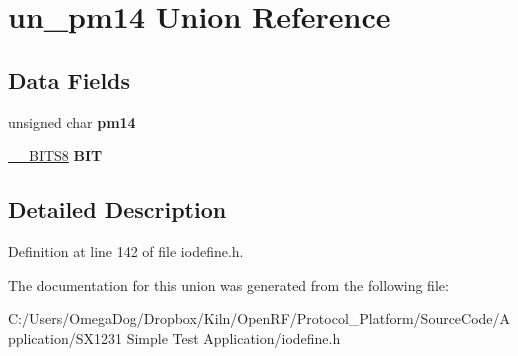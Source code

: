 \hypertarget{unionun__pm14}{\section{un\-\_\-pm14 Union Reference}
\label{unionun__pm14}
}
\subsection*{Data Fields}
\begin{DoxyCompactItemize}
\item 
\hypertarget{unionun__pm14_a8e44b270d76a3c369c8c61096c678b5a}{unsigned char {\bfseries pm14}}\label{unionun__pm14_a8e44b270d76a3c369c8c61096c678b5a}

\item 
\hypertarget{unionun__pm14_ab9da5258687033647d662b295279c9b9}{\hyperlink{struct_____b_i_t_s8}{\-\_\-\-\_\-\-B\-I\-T\-S8} {\bfseries B\-I\-T}}\label{unionun__pm14_ab9da5258687033647d662b295279c9b9}

\end{DoxyCompactItemize}


\subsection{Detailed Description}


Definition at line 142 of file iodefine.\-h.



The documentation for this union was generated from the following file\-:\begin{DoxyCompactItemize}
\item 
C\-:/\-Users/\-Omega\-Dog/\-Dropbox/\-Kiln/\-Open\-R\-F/\-Protocol\-\_\-\-Platform/\-Source\-Code/\-Application/\-S\-X1231 Simple Test Application/iodefine.\-h\end{DoxyCompactItemize}
